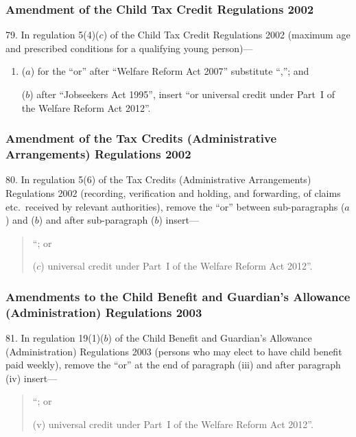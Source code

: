 \documentclass[12pt,a4paper]{article}
\begin{document}
\subsubsection[79. Amendment of the Child Tax Credit Regulations 2002]{Amendment of the Child Tax Credit Regulations 2002}

79.  In regulation 5(4)($c$)  of the Child Tax Credit Regulations 2002 (maximum age and prescribed conditions for a qualifying young person)—
\begin{enumerate}\item[]
($a$) for the “or” after “Welfare Reform Act 2007” substitute “,”; and

($b$) after “Jobseekers Act 1995”, insert “or universal credit under Part~I of the Welfare Reform Act 2012”.
\end{enumerate}

\subsubsection[80. Amendment of the Tax Credits (Administrative Arrangements) Regulations 2002]{Amendment of the Tax Credits (Administrative Arrangements) Regulations 2002}

80.  In regulation 5(6) of the Tax Credits (Administrative Arrangements) Regulations 2002 (recording, verification and holding, and forwarding, of claims etc.\ received by relevant authorities), remove the “or” between sub-paragraphs ($a$)  and ($b$)  and after sub-paragraph ($b$)  insert—
\begin{quotation}
“; or

($c$) universal credit under Part~I of the Welfare Reform Act 2012”.
\end{quotation}

\subsubsection[81. Amendments to the Child Benefit and Guardian’s Allowance (Administration) Regulations 2003]{Amendments to the Child Benefit and Guardian’s Allowance (Administration) Regulations 2003}

81.  In regulation 19(1)($b$)  of the Child Benefit and Guardian’s Allowance (Administration) Regulations 2003 (persons who may elect to have child benefit paid weekly), remove the “or” at the end of paragraph (iii)  and after paragraph (iv)  insert—
\begin{quotation}
“; or

(v) universal credit under Part~I of the Welfare Reform Act 2012”.
\end{quotation}
\end{document}
